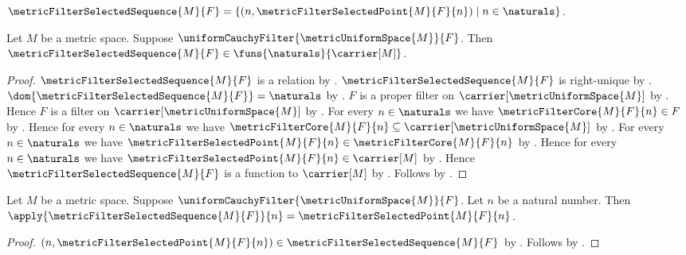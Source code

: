 \begin{definition}\label{metric_filter_selected_sequence}
    $\metricFilterSelectedSequence{M}{F}=
        \{(n,\metricFilterSelectedPoint{M}{F}{n})
            \mid n\in\naturals\}$.
\end{definition}

\begin{proposition}\label{metric_filter_selected_sequence_type}
    Let $M$ be a metric space.
    Suppose $\uniformCauchyFilter{\metricUniformSpace{M}}{F}$.
    Then
        $\metricFilterSelectedSequence{M}{F}
            \in\funs{\naturals}{\carrier[M]}$.
\end{proposition}
\begin{proof}
    $\metricFilterSelectedSequence{M}{F}$ is a relation
        by .
    $\metricFilterSelectedSequence{M}{F}$ is right-unique
        by
        .
    $\dom{\metricFilterSelectedSequence{M}{F}}=\naturals$
        by
        .
    $F$ is a proper filter on $\carrier[\metricUniformSpace{M}]$
        by .
    Hence $F$ is a filter on $\carrier[\metricUniformSpace{M}]$
        by .
    For every $n\in\naturals$ we have
        $\metricFilterCore{M}{F}{n}\in F$
        by .
    Hence for every $n\in\naturals$ we have
        $\metricFilterCore{M}{F}{n}
            \subseteq\carrier[\metricUniformSpace{M}]$
        by .
    For every $n\in\naturals$ we have
        $\metricFilterSelectedPoint{M}{F}{n}
            \in\metricFilterCore{M}{F}{n}$
        by .
    Hence for every $n\in\naturals$ we have
        $\metricFilterSelectedPoint{M}{F}{n}\in\carrier[M]$
        by .
    Hence $\metricFilterSelectedSequence{M}{F}$ is a function to
        $\carrier[M]$
        by
        .
    Follows by .
\end{proof}

\begin{proposition}\label{metric_filter_selected_sequence_application}
    Let $M$ be a metric space.
    Suppose $\uniformCauchyFilter{\metricUniformSpace{M}}{F}$.
    Let $n$ be a natural number.
    Then
        $\apply{\metricFilterSelectedSequence{M}{F}}{n}
            =\metricFilterSelectedPoint{M}{F}{n}$.
\end{proposition}
\begin{proof}
    $(n,\metricFilterSelectedPoint{M}{F}{n})
        \in\metricFilterSelectedSequence{M}{F}$
        by .
    Follows by
        .
\end{proof}

